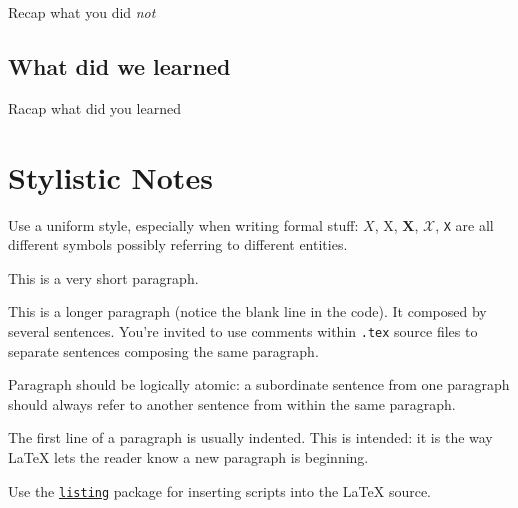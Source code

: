 \documentclass{scrartcl}
\begin{document}
Recap what you did \emph{not}

\subsection{What did we learned}

Racap what did you learned

\section*{Stylistic Notes}

Use a uniform style, especially when writing formal stuff: $X$, X, $\mathbf{X}$, $\mathcal{X}$, \texttt{X} are all different symbols possibly referring to different entities. 

This is a very short paragraph.

This is a longer paragraph (notice the blank line in the code).
It composed by several sentences.
%
You're invited to use comments within \texttt{.tex} source files to separate sentences composing the same paragraph.

Paragraph should be logically atomic: a subordinate sentence from one paragraph should always refer to another sentence from within the same paragraph.

The first line of a paragraph is usually indented.
%
This is intended: it is the way \LaTeX{} lets the reader know a new paragraph is beginning.

Use the \href{https://en.wikibooks.org/wiki/LaTeX/Source_Code_Listings}{\texttt{listing}} package for inserting scripts into the \LaTeX{} source.

\nocite{*} %


\end{document}
